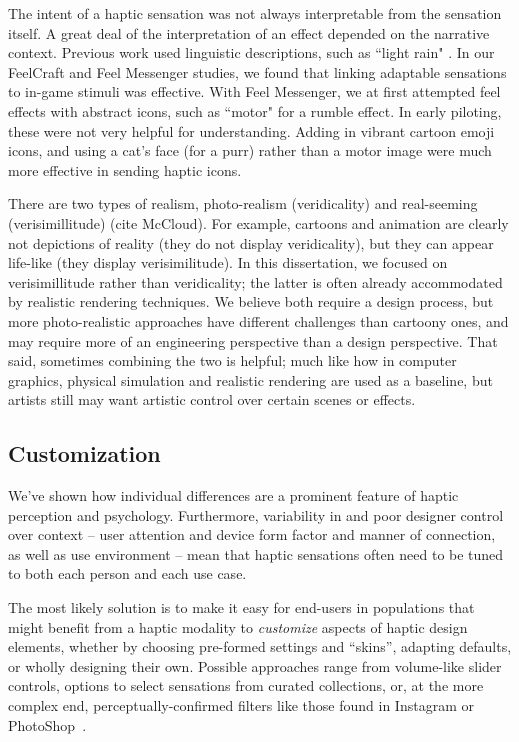 The intent of a haptic sensation was not always interpretable from the sensation itself.
A great deal of the interpretation of an effect depended on the narrative context.
Previous work used linguistic descriptions, such as ``light rain" \cite{Israr2014}.
In our FeelCraft and Feel Messenger studies, we found that linking adaptable sensations to in-game stimuli was effective.
With Feel Messenger, we at first attempted feel effects with abstract icons, such as ``motor" for a rumble effect. 
In early piloting, these were not very helpful for understanding.
Adding in vibrant cartoon emoji icons, and using  a cat's face (for a purr) rather than a motor image were much more effective in sending haptic icons.


There are two types of realism, photo-realism (veridicality) and real-seeming (verisimillitude) (cite McCloud).
For example, cartoons and animation are clearly not depictions of reality (they do not display veridicality), but they can appear life-like (they display verisimilitude).
In this dissertation, we focused on verisimillitude rather than veridicality; the latter is often already accommodated by realistic rendering techniques.
We believe both require a design process, but more photo-realistic approaches have different challenges than cartoony ones, and may require more of an engineering perspective than a design perspective.
That said, sometimes combining the two is helpful; much like how in computer graphics, physical simulation and realistic rendering are used as a baseline, but artists still may want artistic control over certain scenes or effects.




\subsection{Customization}
We've shown how individual differences are a prominent feature of haptic perception and psychology.
Furthermore,  variability in and poor designer control over context --  user attention and  device form factor and manner of connection, as well as use environment -- mean that haptic sensations often need to be tuned to both each person and each use case.

The most likely solution   is to make it easy for end-users in populations that might benefit from a haptic modality to \textit{customize} aspects of haptic design elements, whether by choosing pre-formed settings and ``skins'', adapting defaults, or wholly designing their own. 
Possible approaches range from volume-like slider controls, options to select sensations from curated collections, or, at the more complex end, perceptually-confirmed filters like those found in Instagram or PhotoShop~\cite{Seifi2014,seifi2015vibviz,SchneiderAsiaHaptics2014}.


